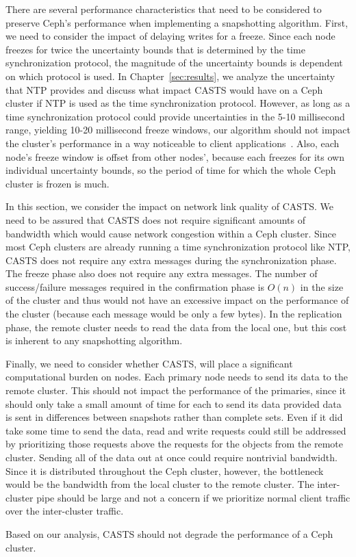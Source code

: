 There are several performance characteristics that need to be
considered to preserve Ceph's performance when implementing a
snapshotting algorithm. First, we need to consider the impact of
delaying writes for a freeze. Since each node freezes for twice the
uncertainty bounds that is determined by the time synchronization
protocol, the magnitude of the uncertainty bounds is dependent on
which protocol is used. In Chapter~\ref{sec:results}, we analyze the
uncertainty that NTP provides and discuss what impact CASTS would have
on a Ceph cluster if NTP is used as the time synchronization
protocol. However, as long as a time synchronization protocol could
provide uncertainties in the 5-10 millisecond range, yielding 10-20
millisecond freeze windows, our algorithm should not impact the
cluster's performance in a way noticeable to client
applications~\citep{Sage}. Also, each node's freeze window is
offset from other nodes', because each freezes for its own individual
uncertainty bounds, so the period of time for which the whole Ceph cluster is
frozen is much.

In this section, we consider the impact on network link quality of
CASTS. We need to be assured that CASTS does not
require significant amounts of bandwidth which would cause network
congestion within a Ceph cluster. Since most Ceph clusters are already
running a time synchronization protocol like NTP, CASTS does
not require any extra messages during the synchronization phase. The
freeze phase also does not require any extra messages. The number of
success/failure messages required in the confirmation phase is $O(n)$
in the size of the cluster and thus would not have an excessive impact
on the performance of the cluster (because each message would be only
a few bytes). In the replication phase, the remote cluster needs to
read the data from the local one, but this cost is inherent to any
snapshotting algorithm.

Finally, we need to consider whether CASTS, will place a significant
computational burden on nodes. Each primary node needs to send its
data to the remote cluster. This should not impact the performance of
the primaries, since it should only take a small amount of time for
each to send its data provided data is sent in differences between
snapshots rather than complete sets. Even if it did take some time to
send the data, read and write requests could still be addressed by
prioritizing those requests above the requests for the objects from
the remote cluster. Sending all of the data out at once could require
nontrivial bandwidth. Since it is distributed throughout the Ceph
cluster, however, the bottleneck would be the bandwidth from the local
cluster to the remote cluster. The inter-cluster pipe should be
large and not a concern if we prioritize normal client traffic over
the inter-cluster traffic.

Based on our analysis, CASTS should not degrade the
performance of a Ceph cluster.
